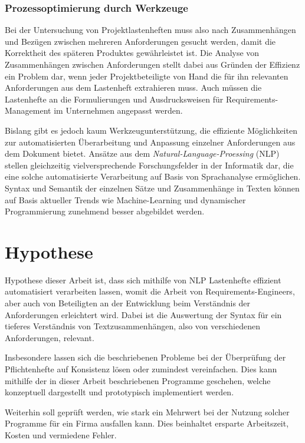 \documentclass[12pt]{report}
\begin{document}
\subsubsection{Prozessoptimierung durch Werkzeuge}
Bei der Untersuchung von Projektlastenheften muss also nach Zusammenhängen und Bezügen zwischen mehreren Anforderungen gesucht werden, damit die Korrektheit des späteren Produktes gewährleistet ist. Die Analyse von Zusammenhängen zwischen Anforderungen stellt dabei aus Gründen der Effizienz ein Problem dar, wenn jeder Projektbeteiligte von Hand die für ihn relevanten Anforderungen aus dem Lastenheft extrahieren muss. Auch müssen die Lastenhefte an die Formulierungen und Ausdrucksweisen für Requirements-Management im Unternehmen angepasst werden. 

Bislang gibt es jedoch kaum Werkzeugunterstützung, die effiziente Möglichkeiten zur automatisierten Überarbeitung und Anpassung einzelner Anforderungen aus dem Dokument bietet. Ansätze aus dem \textit{Natural-Language-Proessing} (NLP) stellen gleichzeitig vielversprechende Forschungsfelder in der Informatik dar, die eine solche automatisierte Verarbeitung auf Basis von Sprachanalyse ermöglichen. Syntax und Semantik der einzelnen Sätze und Zusammenhänge in Texten können auf Basis aktueller Trends wie Machine-Learning und dynamischer Programmierung zunehmend besser abgebildet werden.

\section{Hypothese}
Hypothese dieser Arbeit ist, dass sich mithilfe von NLP Lastenhefte effizient automatisiert verarbeiten lassen, womit die Arbeit von Requirements-Engineers, aber auch von Beteiligten an der Entwicklung beim Verständnis der Anforderungen erleichtert wird. Dabei ist die Auswertung der Syntax für ein tieferes Verständnis von Textzusammenhängen, also von verschiedenen Anforderungen, relevant.

Insbesondere lassen sich die beschriebenen Probleme bei der Überprüfung der Pflichtenhefte auf Konsistenz lösen oder zumindest vereinfachen. Dies kann mithilfe der in dieser Arbeit beschriebenen Programme geschehen, welche konzeptuell dargestellt und prototypisch implementiert werden. 

Weiterhin soll geprüft werden, wie stark ein Mehrwert bei der Nutzung solcher Programme für ein Firma ausfallen kann. Dies beinhaltet ersparte Arbeitszeit, Kosten und vermiedene Fehler. 
\end{document}
